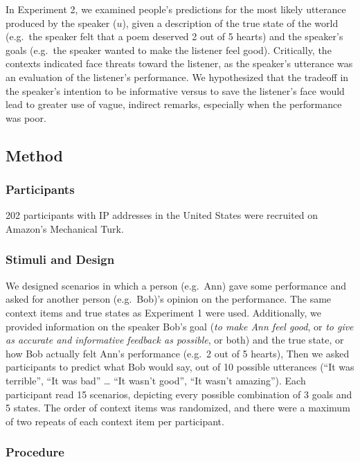 \documentclass[10pt, letterpaper]{article}
\begin{document}
In Experiment 2, we examined people's predictions for the most likely
utterance produced by the speaker (\(u\)), given a description of the
true state of the world (e.g.~the speaker felt that a poem deserved 2
out of 5 hearts) and the speaker's goals (e.g.~the speaker wanted to
make the listener feel good). Critically, the contexts indicated face
threats toward the listener, as the speaker's utterance was an
evaluation of the listener's performance. We hypothesized that the
tradeoff in the speaker's intention to be informative versus to save the
listener's face would lead to greater use of vague, indirect remarks,
especially when the performance was poor.

\subsection{Method}\label{method-1}

\subsubsection{Participants}\label{participants-1}

202 participants with IP addresses in the United States were recruited
on Amazon's Mechanical Turk.

\subsubsection{Stimuli and Design}\label{stimuli-and-design-1}

We designed scenarios in which a person (e.g.~Ann) gave some performance
and asked for another person (e.g.~Bob)'s opinion on the performance.
The same context items and true states as Experiment 1 were used.
Additionally, we provided information on the speaker Bob's goal
(\emph{to make Ann feel good}, or \emph{to give as accurate and
informative feedback as possible}, or both) and the true state, or how
Bob actually felt Ann's performance (e.g.~2 out of 5 hearts), Then we
asked participants to predict what Bob would say, out of 10 possible
utterances (``It was terrible'', ``It was bad'' \ldots{} ``It wasn't
good'', ``It wasn't amazing''). Each participant read 15 scenarios,
depicting every possible combination of 3 goals and 5 states. The order
of context items was randomized, and there were a maximum of two repeats
of each context item per participant.

\subsubsection{Procedure}\label{procedure-1}
\end{document}
